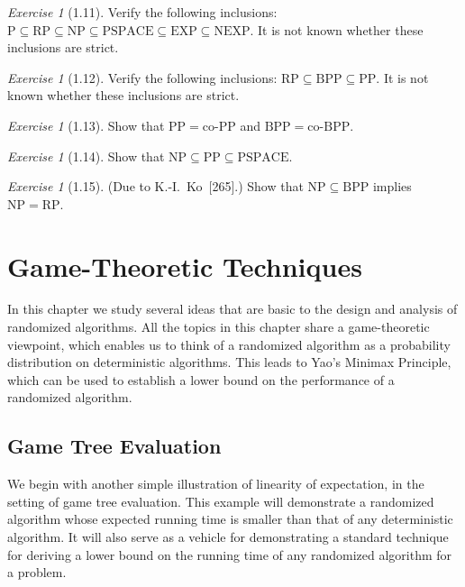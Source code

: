 \documentclass[twoside,12pt]{book}
\theoremstyle{plain}
\theoremstyle{definition}
\theoremstyle{remark}
\newtheorem{exercise}[theorem]{Exercise}
\begin{document}
\begin{exercise}[1.11]
Verify the following inclusions:
$\mathrm{P}\subseteq\mathrm{RP}\subseteq\mathrm{NP}
  \subseteq\mathrm{PSPACE}\subseteq\mathrm{EXP}\subseteq\mathrm{NEXP}$.
It is not known whether these inclusions are strict.
\end{exercise}

\begin{exercise}[1.12]
Verify the following inclusions:
$\mathrm{RP}\subseteq\mathrm{BPP}\subseteq\mathrm{PP}$.
It is not known whether these inclusions are strict.
\end{exercise}

\begin{exercise}[1.13]
Show that $\mathrm{PP}=\mathrm{co\text{-}PP}$ and
$\mathrm{BPP}=\mathrm{co\text{-}BPP}$.
\end{exercise}

\begin{exercise}[1.14]
Show that $\mathrm{NP}\subseteq\mathrm{PP}\subseteq\mathrm{PSPACE}$.
\end{exercise}

\begin{exercise}[1.15]
(Due to K.-I.~Ko~[265].)  Show that $\mathrm{NP}\subseteq\mathrm{BPP}$
implies $\mathrm{NP}=\mathrm{RP}$.
\end{exercise}


\chapter{Game-Theoretic Techniques}
\label{ch:game-theoretic}

In this chapter we study several ideas that are basic to the design and
analysis of randomized algorithms.  All the topics in this chapter share a
game-theoretic viewpoint, which enables us to think of a randomized algorithm
as a probability distribution on deterministic algorithms.  This leads to
Yao's Minimax Principle, which can be used to establish a lower bound on the
performance of a randomized algorithm.

\section{Game Tree Evaluation}
\label{sec:gametree}

We begin with another simple illustration of linearity of expectation, in the
setting of game tree evaluation.  This example will demonstrate a randomized
algorithm whose expected running time is smaller than that of any
deterministic algorithm.  It will also serve as a vehicle for demonstrating a
standard technique for deriving a lower bound on the running time of any
randomized algorithm for a problem.
\end{document}
